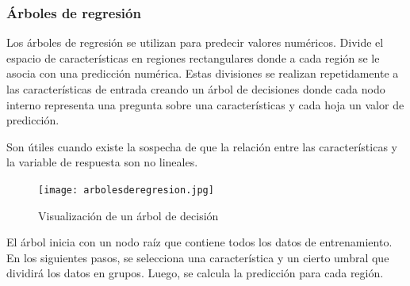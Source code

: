 \documentclass[a4paper, 12pt]{book}
\begin{document}
\subsubsection{Árboles de regresión}
Los árboles de regresión se utilizan para predecir valores numéricos. Divide el espacio de características en regiones rectangulares donde a cada región se le asocia con una predicción numérica. Estas divisiones se realizan repetidamente a las características de entrada creando un árbol de decisiones donde cada nodo interno representa una pregunta sobre una características y cada hoja un valor de predicción.

Son útiles cuando existe la sospecha de que la relación entre las características y la variable de respuesta son no lineales.

\begin{figure}[H]
	\centering
	\texttt{[image: arbolesderegresion.jpg]}
	\caption{Visualización de un árbol de decisión}
\end{figure}

El árbol inicia con un nodo raíz que contiene todos los datos de entrenamiento. En los siguientes pasos, se selecciona una característica y un cierto umbral que dividirá los datos en grupos. Luego, se calcula la predicción para cada región.
\end{document}
